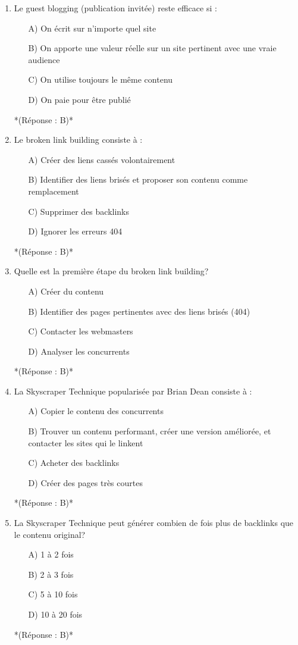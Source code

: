 \documentclass[12pt,a4paper,twoside]{report}
\begin{document}
\begin{enumerate}
\item Le guest blogging (publication invitée) reste efficace si :
\begin{itemize}
\item[A)] On écrit sur n'importe quel site
\item[B)] On apporte une valeur réelle sur un site pertinent avec une vraie audience
\item[C)] On utilise toujours le même contenu
\item[D)] On paie pour être publié
\end{itemize}
*(Réponse : B)*

\item Le broken link building consiste à :
\begin{itemize}
\item[A)] Créer des liens cassés volontairement
\item[B)] Identifier des liens brisés et proposer son contenu comme remplacement
\item[C)] Supprimer des backlinks
\item[D)] Ignorer les erreurs 404
\end{itemize}
*(Réponse : B)*

\item Quelle est la première étape du broken link building?
\begin{itemize}
\item[A)] Créer du contenu
\item[B)] Identifier des pages pertinentes avec des liens brisés (404)
\item[C)] Contacter les webmasters
\item[D)] Analyser les concurrents
\end{itemize}
*(Réponse : B)*

\item La Skyscraper Technique popularisée par Brian Dean consiste à :
\begin{itemize}
\item[A)] Copier le contenu des concurrents
\item[B)] Trouver un contenu performant, créer une version améliorée, et contacter les sites qui le linkent
\item[C)] Acheter des backlinks
\item[D)] Créer des pages très courtes
\end{itemize}
*(Réponse : B)*

\item La Skyscraper Technique peut générer combien de fois plus de backlinks que le contenu original?
\begin{itemize}
\item[A)] 1 à 2 fois
\item[B)] 2 à 3 fois
\item[C)] 5 à 10 fois
\item[D)] 10 à 20 fois
\end{itemize}
*(Réponse : B)*


\end{enumerate}
\end{document}

